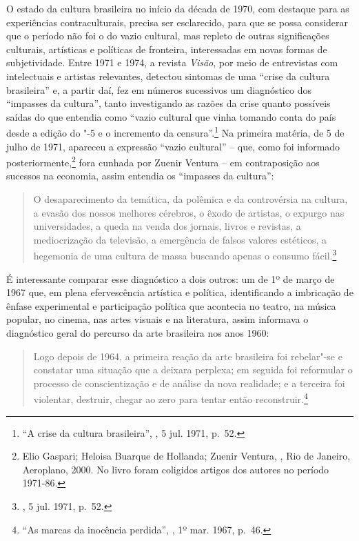\pagebreak

\asterisc

O estado da cultura brasileira no início da década de 1970, com destaque
para as experiências contraculturais, precisa ser esclarecido, para que
se possa considerar que o período não foi o do vazio cultural, mas repleto
de outras significações culturais, artísticas e políticas de fronteira,
interessadas em novas formas de subjetividade. Entre 1971 e 1974, a
revista \emph{Visão}, por meio de entrevistas com intelectuais e artistas
relevantes, detectou sintomas de uma ``crise da cultura brasileira'' e,
a partir daí, fez em números sucessivos um diagnóstico dos ``impasses da
cultura'', tanto investigando as razões da crise quanto possíveis saídas
do que entendia como ``vazio cultural que vinha tomando conta do
país desde a edição do "-5 e o incremento da censura''.\footnote{``A
  crise da cultura brasileira'', {}, 5 jul. 1971, p.~52.} Na
primeira matéria, de 5 de julho de 1971, apareceu a expressão ``vazio
cultural'' -- que, como foi informado posteriormente,\footnote{Elio
  Gaspari; Heloisa Buarque de Hollanda; Zuenir Ventura, {}, Rio de Janeiro, Aeroplano, 2000.
  No livro foram coligidos artigos dos autores no período 1971-86.}
fora cunhada por Zuenir Ventura -- em contraposição aos sucessos na
economia, assim entendia os ``impasses da cultura'':

\begin{quote}
O desaparecimento da temática, da polêmica e da controvérsia na cultura,
a evasão dos nossos melhores cérebros, o êxodo de artistas, o expurgo
nas universidades, a queda na venda dos jornais, livros e revistas, a
mediocrização da televisão, a emergência de falsos valores estéticos, a
hegemonia de uma cultura de massa buscando apenas o consumo
fácil.\footnote{{}, 5 jul. 1971, p.~52.}
\end{quote}

É interessante comparar esse diagnóstico a dois outros: um de 1º de
março de 1967 que, em plena efervescência artística e política,
identificando a imbricação de ênfase experimental e participação
política que acontecia no teatro, na música popular, no cinema, nas
artes visuais e na literatura, assim informava o diagnóstico geral do
percurso da arte brasileira nos anos 1960:

\begin{quote}
Logo depois de 1964, a primeira reação da arte brasileira foi rebelar"-se
e constatar uma situação que a deixara perplexa; em seguida foi
reformular o processo de conscientização e de análise da nova realidade;
e a terceira foi violentar, destruir, chegar ao zero para tentar então
reconstruir.\footnote{``As marcas da inocência perdida'', {},
  1º mar. 1967, p.~46.}
\end{quote}

